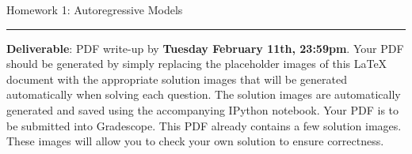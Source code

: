 \documentclass{article}
\newcommand{\ruleskip}{\bigskip\hrule\bigskip}
\begin{document}
\pagestyle{myheadings} 

{\huge
\noindent Homework 1: Autoregressive Models}
\ruleskip

{\bf Deliverable}:  PDF write-up by {\bf Tuesday February 11th, 23:59pm}.  Your PDF should be generated by simply replacing the placeholder images of this LaTeX document with the appropriate solution images that will be generated automatically when solving each question. The solution images are automatically generated and saved using the accompanying IPython notebook. Your PDF is to be submitted into Gradescope. This PDF already contains a few solution images.  These images will allow you to check your own solution to ensure correctness.


\vspace{.2in}

\end{document}
